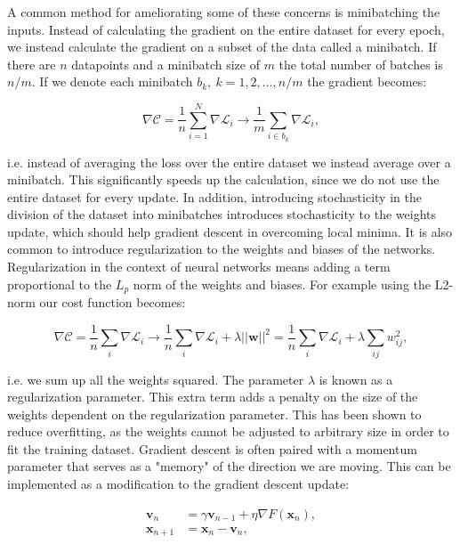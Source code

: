 A common method for ameliorating some of these concerns
is minibatching the inputs. Instead of calculating
the gradient on the entire dataset for every epoch,
we instead calculate the gradient on a subset
of the data called a minibatch.
If there are $n$ datapoints and a minibatch size
of $m$ the total number of batches is $n/m$.
If we denote each minibatch $b_k, \ k=1,2,\dots,n/m$
the gradient becomes:

\begin{equation}
 \nabla \mathcal{C} = \frac{1}{n} \sum_{i=1}^N
    \nabla \mathcal{L}_i \rightarrow
    \frac{1}{m} \sum_{i \in b_k} \nabla \mathcal{L}_i , 
\end{equation}

i.e. instead of averaging the loss over the entire dataset
we instead average over a minibatch.
This significantly speeds up the calculation, since
we do not use the entire dataset for every update.
In addition, introducing stochasticity in the
division of the dataset into minibatches introduces stochasticity
to the weights update, which should help gradient descent
in overcoming local minima.
It is also common to introduce regularization to the weights
and biases of the networks. Regularization in the context
of neural networks means adding a term proportional
to the $L_p$ norm of the weights and biases.
For example using the L2-norm our cost function becomes:

\begin{equation}
 \nabla \mathcal{C} = \frac{1}{n} \sum_i \nabla \mathcal{L}_i
    \rightarrow \frac{1}{n} \sum_i \nabla \mathcal{L}_i
    + \lambda \left| \left| \bm{w} \right| \right|^2
    = \frac{1}{n} \sum_i \nabla \mathcal{L}_i
    + \lambda \sum_{ij} w_{ij}^2 , 
\end{equation}

i.e. we sum up all the weights squared.
The parameter $\lambda$ is known as a regularization parameter.
This extra term adds a penalty on the size of the weights
dependent on the regularization parameter. This has
been shown to reduce overfitting, as the weights
cannot be adjusted to arbitrary size in order
to fit the training dataset.
Gradient descent is often paired with a momentum parameter
that serves as a "memory" of the direction we are moving.
This can be implemented as a modification to the
gradient descent update:

\begin{equation}
    \begin{split}
        \bm{v}_n &= \gamma \bm{v}_{n-1} + \eta \nabla F(\bm{x}_n) , \\
        \bm{x}_{n+1} &= \bm{x}_n - \bm{v}_n ,
    \end{split}
\end{equation}

